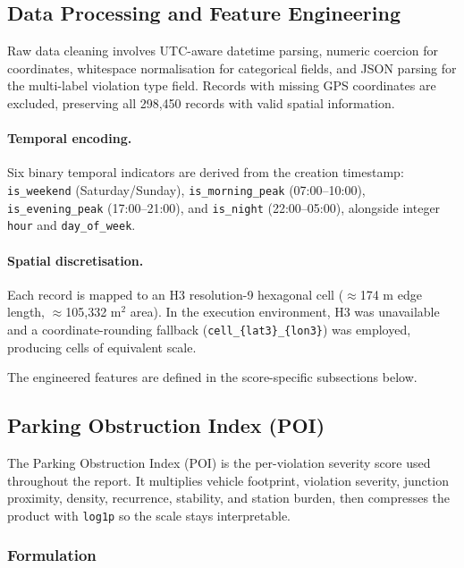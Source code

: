 \documentclass[12pt,a4paper]{article}
\begin{document}
\subsection{Data Processing and Feature Engineering}

Raw data cleaning involves UTC-aware datetime parsing, numeric coercion for coordinates,
whitespace normalisation for categorical fields, and JSON parsing for the multi-label
violation type field. Records with missing GPS coordinates are excluded, preserving all
298,450 records with valid spatial information.

\paragraph{Temporal encoding.}
Six binary temporal indicators are derived from the creation timestamp:
\texttt{is\_weekend} (Saturday/Sunday), \texttt{is\_morning\_peak} (07:00--10:00),
\texttt{is\_evening\_peak} (17:00--21:00), and \texttt{is\_night} (22:00--05:00), alongside
integer \texttt{hour} and \texttt{day\_of\_week}.

\paragraph{Spatial discretisation.}
Each record is mapped to an H3 resolution-9 hexagonal cell ($\approx$174 m edge length,
$\approx$105,332 m$^2$ area). In the execution environment, H3 was unavailable and a
coordinate-rounding fallback (\texttt{cell\_\{lat3\}\_\{lon3\}}) was employed, producing
cells of equivalent scale.

The engineered features are defined in the score-specific subsections below.

\subsection{Parking Obstruction Index (POI)}

The Parking Obstruction Index (POI) is the per-violation severity score used throughout the report. It multiplies vehicle footprint, violation severity, junction proximity, density, recurrence, stability, and station burden, then compresses the product with \texttt{log1p} so the scale stays interpretable.

\subsubsection*{Formulation}
\end{document}

